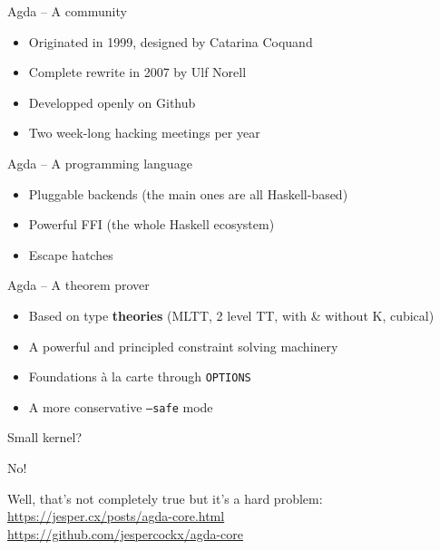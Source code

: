 \documentclass{beamer}
\begin{document}
\begin{frame}{Agda -- A community}
    \begin{itemize}
      \item Originated in 1999, designed by Catarina Coquand
      \item Complete rewrite in 2007 by Ulf Norell
      \item Developped openly on Github
      \item Two week-long hacking meetings per year
    \end{itemize}
\end{frame}

\begin{frame}{Agda -- A programming language}
    \begin{itemize}
      \item Pluggable backends (the main ones are all Haskell-based)
      \item Powerful FFI (the whole Haskell ecosystem)
      \item Escape hatches
    \end{itemize}
\end{frame}

\begin{frame}{Agda -- A theorem prover}
  \begin{itemize}
    \item Based on type \textbf{theories} (MLTT, 2 level TT, with \& without K, cubical)
    \item A powerful and principled constraint solving machinery
    \item Foundations à la carte through \texttt{OPTIONS}
    \item A more conservative \texttt{--safe} mode
  \end{itemize}
\end{frame}

\begin{frame}{Small kernel?}
  \begin{center}
    \Huge No!
  \end{center}

\vfill
Well, that's not completely true but it's a hard problem:\\
\url{https://jesper.cx/posts/agda-core.html}\\
\url{https://github.com/jespercockx/agda-core}
\end{frame}
\end{document}
